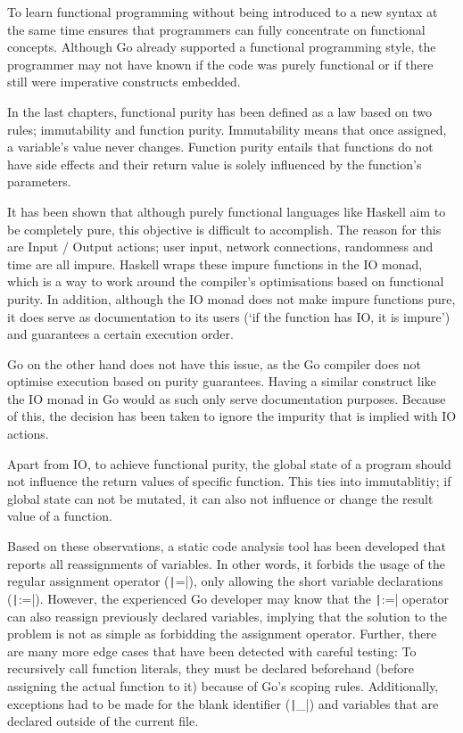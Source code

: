
To learn functional programming without being introduced to a new syntax at the same time
ensures that programmers can fully concentrate on functional concepts. Although Go already
supported a functional programming style, the programmer may not have known if the code was
purely functional or if there still were imperative constructs embedded.

In the last chapters, functional purity has been defined as a law based on two rules; immutability
and function purity. Immutability means that once assigned, a variable's value never
changes. Function purity entails that functions do not have side effects and their return
value is solely influenced by the function's parameters.

It has been shown that although purely functional languages like Haskell aim to be completely
pure, this objective is difficult to accomplish. The reason for this are Input / Output actions; user
input, network connections, randomness and time are all impure. Haskell wraps
these impure functions in the IO monad, which is a way to work around the compiler's optimisations
based on functional purity. In addition, although the IO monad does not make impure functions pure, it
does serve as documentation to its users (`if the function has IO, it is impure') and
guarantees a certain execution order.

Go on the other hand does not have this issue, as the Go compiler does not optimise execution
based on purity guarantees. Having a similar construct like the IO monad in Go would as such
only serve documentation purposes. Because of this, the decision has been taken to ignore
the impurity that is implied with IO actions.

Apart from IO, to achieve functional purity, the global state of a program should not influence
the return values of specific function. This ties into immutablitiy; if global state can
not be mutated, it can also not influence or change the result value of a function.

Based on these observations, a static code analysis tool has been developed that reports
all reassignments of variables. In other words, it forbids the usage of the regular
assignment operator (\texttt|=|), only allowing the short variable declarations
(\texttt|:=|). However, the experienced Go developer may know that the \texttt|:=|
operator can also reassign previously declared variables, implying that the solution to the
problem is not as simple as forbidding the assignment operator.
Further, there are many more edge cases that have been detected with careful testing:
To recursively call function literals, they must be declared beforehand (before assigning
the actual function to it) because of Go's scoping rules. Additionally, exceptions
had to be made for the blank identifier (\texttt|_|) and variables that are declared
outside of the current file.

